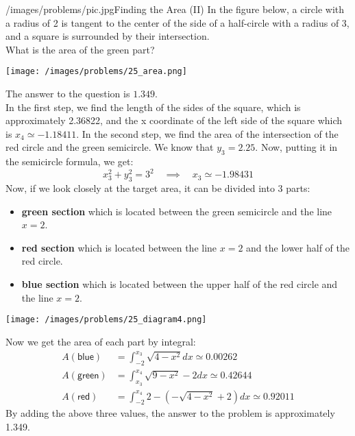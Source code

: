 \begin{problem}{/images/problems/pic.jpg}{Finding the Area (II)}
In the figure below, a circle with a radius of 2 is tangent to the center of the side of a half-circle with a radius of 3, and a square is surrounded by their intersection.\\[0.2cm]

What is the area of the green part?

\begin{center}
	\texttt{[image: /images/problems/25\_area.png]}
\end{center}

\end{problem}
\begin{solution}
The answer to the question is $1.349$.\\[0.2cm]
 \noindent In the first step, we find the length of the sides of the square, which is approximately 2.36822, and the x coordinate of the left side of the square which is $x_4 \simeq -1.18411$. In the second step, we find the area of the intersection of the red circle and the green semicircle. We know that $y_3 = 2.25$. Now, putting it in the semicircle formula, we get: $$ x_3^2+y_3^2 = 3^2 \quad \implies \quad x_3 \simeq -1.98431 $$ Now, if we look closely at the target area, it can be divided into 3 parts: 
 \begin{itemize}
 \item \textbf{green section} which is located between the green semicircle and the line $x=2$. 
 \item \textbf{red section} which is located between the line $x=2$ and the lower half of the red circle. 
 \item \textbf{blue section} which is located between the upper half of the red circle and the line $x=2$. 
 \end{itemize}
\begin{center}
	\texttt{[image: /images/problems/25\_diagram4.png]}
\end{center}
 
 Now we get the area of each part by integral: $$ \begin{aligned} A(\textsf{blue}) &= \int_{-2}^{x_3}\sqrt{4-x^2}dx \simeq 0.00262 \\ A(\textsf{green}) &= \int_{x_3}^{x_4}\sqrt{9-x^2}-2 dx \simeq 0.42644 \\ A(\textsf{red}) &= \int_{-2}^{x_4}2 - (-\sqrt{4-x^2} + 2) dx \simeq 0.92011 \end{aligned} $$ By adding the above three values, the answer to the problem is approximately 1.349.\end{solution}

